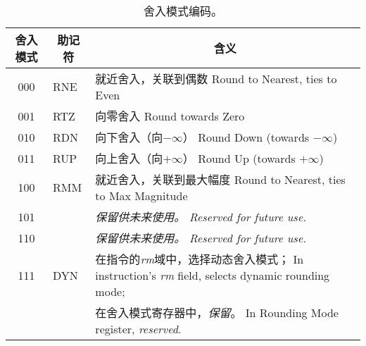 \begin{table}[htp]
\begin{small}
\begin{center}
\begin{tabular}{ccl}
\hline
\multicolumn{1}{|c|}{舍入模式} &
\multicolumn{1}{c|}{助记符} &
\multicolumn{1}{c|}{含义} \\
\hline
\multicolumn{1}{|c|}{000} &
\multicolumn{1}{l|}{RNE} &
\multicolumn{1}{l|}{就近舍入，关联到偶数  Round to Nearest, ties to Even}\\
\hline
\multicolumn{1}{|c|}{001} &
\multicolumn{1}{l|}{RTZ} &
\multicolumn{1}{l|}{向零舍入  Round towards Zero}\\
\hline
\multicolumn{1}{|c|}{010} &
\multicolumn{1}{l|}{RDN} &
\multicolumn{1}{l|}{向下舍入（向$-\infty$）  Round Down (towards $-\infty$)}\\
\hline
\multicolumn{1}{|c|}{011} &
\multicolumn{1}{l|}{RUP} &
\multicolumn{1}{l|}{向上舍入（向$+\infty$）  Round Up (towards $+\infty$)}\\
\hline
\multicolumn{1}{|c|}{100} &
\multicolumn{1}{l|}{RMM} &
\multicolumn{1}{l|}{就近舍入，关联到最大幅度  Round to Nearest, ties to Max Magnitude}\\
\hline
\multicolumn{1}{|c|}{101} &
\multicolumn{1}{l|}{} &
\multicolumn{1}{l|}{\em 保留供未来使用。 Reserved for future use.}\\
\hline
\multicolumn{1}{|c|}{110} &
\multicolumn{1}{l|}{} &
\multicolumn{1}{l|}{\em 保留供未来使用。 Reserved for future use.}\\
\hline
\multicolumn{1}{|c|}{111} &
\multicolumn{1}{l|}{DYN} &
\multicolumn{1}{l|}{在指令的{\em rm}域中，选择动态舍入模式；  In instruction's {\em rm} field, selects dynamic rounding mode;}\\
\multicolumn{1}{|c|}{} &
\multicolumn{1}{l|}{} &
\multicolumn{1}{l|}{在舍入模式寄存器中，{\em 保留}。  In Rounding Mode register, {\em reserved}.}\\
\hline
\end{tabular}
\end{center}
\end{small}
\caption{舍入模式编码。}
\label{rm}
\end{table}

